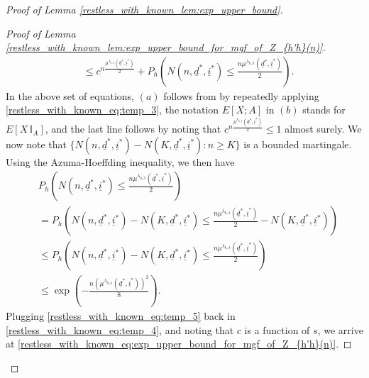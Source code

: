 \begin{proof}[Proof of Lemma \ref{restless_with_known_lem:exp_upper_bound}]
\begin{proof}[Proof of Lemma \ref{restless_with_known_lem:exp_upper_bound_for_mgf_of_Z_{h'h}(n)}]
\begin{align}
	&\leq c^{n\frac{\mu^{\lambda_{h,\delta}}(\underline{d}^*,\underline{i}^*)}{2}}+P_h\left(N(n,\underline{d}^*,\underline{i}^*)\leq\frac{n\mu^{\lambda_{h,\delta}}(\underline{d}^*,\underline{i}^*)}{2}\right).\label{restless_with_known_eq:temp_4}
\end{align}
In the above set of equations, $(a)$ follows from by repeatedly applying \eqref{restless_with_known_eq:temp_3}, the notation $E[X;A]$ in $(b)$ stands for $E[X\,\mathbb{I}_A]$, and the last line follows by noting that $c^{n\frac{\mu^{\lambda_{h,\delta}}(\underline{d}^*,\underline{i}^*)}{2}}\leq 1$ almost surely. We now note that $\{N(n,\underline{d}^*,\underline{i}^*)-N(K,\underline{d}^*,\underline{i}^*):n\geq K\}$ is a bounded martingale. Using the Azuma-Hoeffding inequality, we then have
\begin{align}
	&P_h\left(N(n,\underline{d}^*,\underline{i}^*)\leq\frac{n\mu^{\lambda_{h,\delta}}(\underline{d}^*,\underline{i}^*)}{2}\right)\nonumber\\
	&=P_h\left(N(n,\underline{d}^*,\underline{i}^*)-N(K,\underline{d}^*,\underline{i}^*)\leq\frac{n\mu^{\lambda_{h,\delta}}(\underline{d}^*,\underline{i}^*)}{2}-N(K,\underline{d}^*,\underline{i}^*)\right)\nonumber\\
	&\leq P_h\left(N(n,\underline{d}^*,\underline{i}^*)-N(K,\underline{d}^*,\underline{i}^*)\leq\frac{n\mu^{\lambda_{h,\delta}}(\underline{d}^*,\underline{i}^*)}{2}\right)\nonumber\\
	&\leq \exp\left(-\frac{n(\mu^{\lambda_{h,\delta}}(\underline{d}^*,\underline{i}^*))^2}{8}\right).\label{restless_with_known_eq:temp_5}
\end{align}
Plugging \eqref{restless_with_known_eq:temp_5} back in \eqref{restless_with_known_eq:temp_4}, and noting that $c$ is a function of $s$, we arrive at \eqref{restless_with_known_eq:exp_upper_bound_for_mgf_of_Z_{h'h}(n)}.
\end{proof}


\end{proof}
